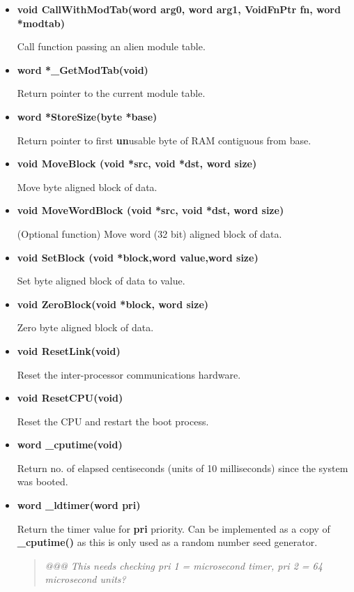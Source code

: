 \begin{itemize}

\item {\bf void CallWithModTab(word arg0, word arg1, VoidFnPtr fn, word *modtab)}

Call function passing an alien module table.

\item {\bf word *\_GetModTab(void)}

Return pointer to the current module table.

\item {\bf word *StoreSize(byte *base)}

Return pointer to first {\bf un}usable byte of RAM contiguous from base.

\item {\bf void MoveBlock (void *src, void *dst, word size)}

Move byte aligned block of data. 

\item {\bf void MoveWordBlock (void *src, void *dst, word size)} 

(Optional function) Move word (32 bit) aligned block of data.

\item {\bf void SetBlock (void *block,word value,word size)} 

Set byte aligned block of data to value.

\item {\bf void ZeroBlock(void *block, word size)} 

Zero byte aligned block of data.

\item {\bf void ResetLink(void)} 

Reset the inter-processor communications hardware.

\item {\bf void ResetCPU(void)} 

Reset the CPU and restart the boot process.

\item {\bf word \_cputime(void)} 

Return no. of elapsed centiseconds (units of 10 milliseconds) since the system
was booted.

\item {\bf word _ldtimer(word pri)} 

Return the timer value for {\bf pri} priority. Can be implemented as a copy of
{\bf \_cputime()} as this is only used as a random number seed generator.
\begin{quote}
\it
@@@ This needs checking pri 1 = microsecond timer, pri 2 = 64 microsecond units?
\rm
\end{quote}


\end{itemize}
